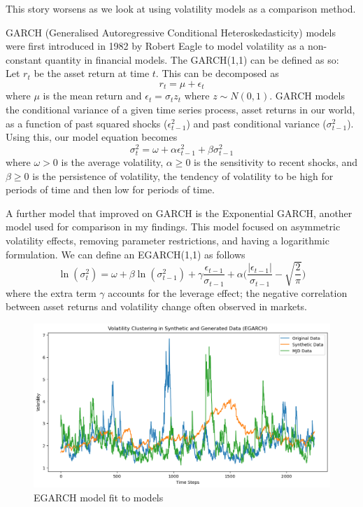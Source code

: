 \documentclass[12pt]{article}
\newcommand{\newp}
    {
    \vskip 0.5cm 
  }
\numberwithin{equation}{section}
\begin{document}
This story worsens as we look at using volatility models as a comparison method. 
\newp
GARCH (Generalised Autoregressive Conditional Heteroskedasticity) models were 
first introduced in 1982 by Robert Eagle \autocite{Eagle} to model volatility 
as a non-constant quantity in financial models. The GARCH(1,1) can be defined as 
so:\\ 
Let $r_t$ be the asset return at time $t$. This can be decomposed as 
\begin{equation}
r_t = \mu + \epsilon_t
\end{equation}
where $\mu$ is the mean return and $\epsilon_t = \sigma_t z_t$ where $z \sim N(0,1)$. 
GARCH models the conditional variance of a given time series process, asset returns in 
our world, as a function of past squared shocks ($\epsilon^2_{t-1}$) and past 
conditional variance ($\sigma^2_{t-1}$). Using this, our model equation becomes
\begin{equation}
  \sigma^2_t = \omega + \alpha\epsilon^2_{t-1} + \beta\sigma^2_{t-1}
\end{equation}
where $\omega > 0$ is the average volatility, $\alpha \geq 0$ is the sensitivity 
to recent shocks, and $\beta \geq0$ is the persistence of volatility, the tendency
of volatility to be high for periods of time and then low for periods of time. 
\newp 
A further model that improved on GARCH is the Exponential GARCH, another model used 
for comparison in my findings. This model focused on asymmetric volatility 
effects, removing parameter restrictions, and having a logarithmic formulation. 
We can define an EGARCH(1,1) as follows 
\begin{equation}
  \ln(\sigma^2_t) = \omega +\beta\ln(\sigma^2_{t-1})+\gamma\frac{\epsilon_{t-1}}
  {\sigma_{t-1}} + \alpha\Biggl(\frac{|\epsilon_{t-1}|}{\sigma_{t-1}}-\sqrt{\frac{2}{\pi}}\Biggr)
\end{equation}
where the extra term $\gamma$ accounts for the leverage effect; the 
negative correlation between asset returns and volatility change often 
observed in markets.
\newp 
\begin{figure}[h!]
  \centering 
  \includegraphics[scale=0.4]{egarch2.png}
  \caption{EGARCH model fit to models}
  \label{fig:egarch2}
\end{figure}
\end{document}
